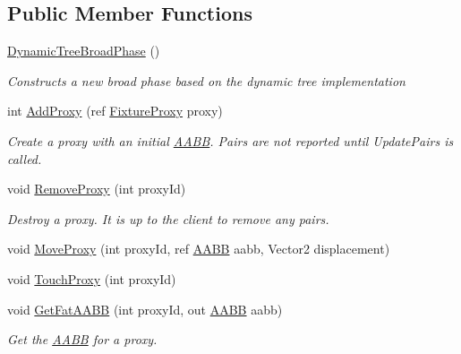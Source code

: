 \subsection*{Public Member Functions}
\begin{DoxyCompactItemize}
\item 
\hyperlink{class_farseer_physics_1_1_collision_1_1_dynamic_tree_broad_phase_a2245654810f5fe2b291046c944505c18}{Dynamic\+Tree\+Broad\+Phase} ()
\begin{DoxyCompactList}\small\item\em Constructs a new broad phase based on the dynamic tree implementation \end{DoxyCompactList}\item 
int \hyperlink{class_farseer_physics_1_1_collision_1_1_dynamic_tree_broad_phase_a632f5315eb3149245dc26e8f11a0ef4f}{Add\+Proxy} (ref \hyperlink{struct_farseer_physics_1_1_dynamics_1_1_fixture_proxy}{Fixture\+Proxy} proxy)
\begin{DoxyCompactList}\small\item\em Create a proxy with an initial \hyperlink{struct_farseer_physics_1_1_collision_1_1_a_a_b_b}{A\+A\+B\+B}. Pairs are not reported until Update\+Pairs is called. \end{DoxyCompactList}\item 
void \hyperlink{class_farseer_physics_1_1_collision_1_1_dynamic_tree_broad_phase_a15ce4940d8b965cc05b23d61a21da9b9}{Remove\+Proxy} (int proxy\+Id)
\begin{DoxyCompactList}\small\item\em Destroy a proxy. It is up to the client to remove any pairs. \end{DoxyCompactList}\item 
void \hyperlink{class_farseer_physics_1_1_collision_1_1_dynamic_tree_broad_phase_a7d74e989e6c42ecef6e48f3ce851e01d}{Move\+Proxy} (int proxy\+Id, ref \hyperlink{struct_farseer_physics_1_1_collision_1_1_a_a_b_b}{A\+A\+B\+B} aabb, Vector2 displacement)
\item 
void \hyperlink{class_farseer_physics_1_1_collision_1_1_dynamic_tree_broad_phase_aae641fa21358f80f82051dc6cbdc1d89}{Touch\+Proxy} (int proxy\+Id)
\item 
void \hyperlink{class_farseer_physics_1_1_collision_1_1_dynamic_tree_broad_phase_a7e0b1522e3cdcca4486a769641305a4e}{Get\+Fat\+A\+A\+B\+B} (int proxy\+Id, out \hyperlink{struct_farseer_physics_1_1_collision_1_1_a_a_b_b}{A\+A\+B\+B} aabb)
\begin{DoxyCompactList}\small\item\em Get the \hyperlink{struct_farseer_physics_1_1_collision_1_1_a_a_b_b}{A\+A\+B\+B} for a proxy. \end{DoxyCompactList}\item 

\end{DoxyCompactItemize}
